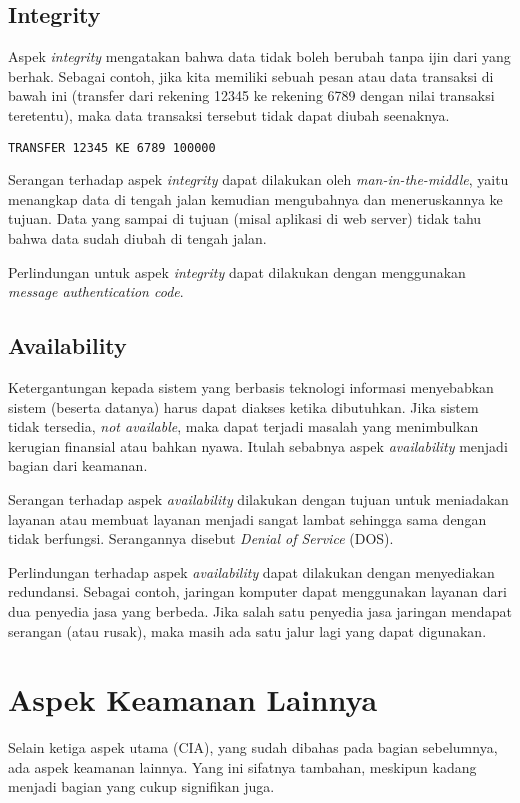 \subsection{Integrity}
Aspek {\em integrity} mengatakan bahwa data tidak boleh berubah
tanpa ijin dari yang berhak.
Sebagai contoh, jika kita memiliki sebuah pesan atau data 
transaksi di bawah ini (transfer dari rekening 12345 ke rekening 6789 
dengan nilai transaksi teretentu), 
maka data transaksi tersebut tidak dapat diubah seenaknya.

\begin{verbatim}
TRANSFER 12345 KE 6789 100000
\end{verbatim}

Serangan terhadap aspek {\em integrity} dapat dilakukan oleh
{\em man-in-the-middle}, yaitu menangkap data di tengah jalan
kemudian mengubahnya dan meneruskannya ke tujuan.
Data yang sampai di tujuan (misal aplikasi di web server) tidak tahu
bahwa data sudah diubah di tengah jalan.

Perlindungan untuk aspek {\em integrity} dapat dilakukan dengan
menggunakan {\em message authentication code}.


\subsection{Availability}
Ketergantungan kepada sistem yang berbasis teknologi informasi
menyebabkan sistem (beserta datanya) harus dapat diakses ketika dibutuhkan.
Jika sistem tidak tersedia, {\em not available}, maka dapat terjadi
masalah yang menimbulkan kerugian finansial atau bahkan nyawa.
Itulah sebabnya aspek {\em availability} menjadi bagian dari keamanan.

Serangan terhadap aspek {\em availability} dilakukan dengan tujuan
untuk meniadakan layanan atau membuat layanan menjadi sangat lambat
sehingga sama dengan tidak berfungsi.
Serangannya disebut {\em Denial of Service} (DOS).

Perlindungan terhadap aspek {\em availability} dapat dilakukan
dengan menyediakan redundansi.
Sebagai contoh, jaringan komputer dapat menggunakan layanan dari
dua penyedia jasa yang berbeda.
Jika salah satu penyedia jasa jaringan mendapat serangan (atau rusak),
maka masih ada satu jalur lagi yang dapat digunakan.


\section{Aspek Keamanan Lainnya}
Selain ketiga aspek utama (CIA), yang sudah dibahas pada bagian sebelumnya,
ada aspek keamanan lainnya. Yang ini sifatnya tambahan, meskipun
kadang menjadi bagian yang cukup signifikan juga.

